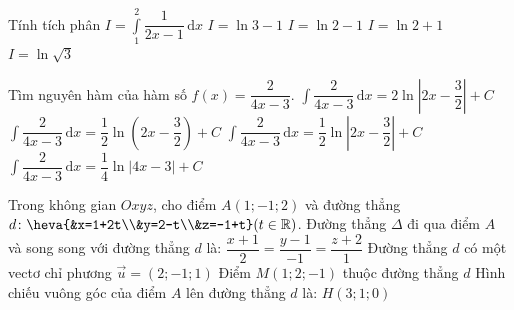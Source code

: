 \begin{ex}%
	Tính tích phân $I=\displaystyle\int \limits_1^2\dfrac{1}{2x-1}\mathrm{\,d}x$
	\choice
	{$I=\ln 3-1$}
	{$I=\ln 2-1$}
	{$I=\ln 2+1$}
	{\True $I=\ln \sqrt{3}$}
\end{ex}

\begin{ex}%
	Tìm nguyên hàm của hàm số $f(x)=\dfrac{2}{4x-3}$.
	\choice
	{$\displaystyle\int \dfrac{2}{4x-3}\mathrm{\,d}x=2\ln \left|2x-\dfrac{3}{2}\right|+C$}
	{$\displaystyle\int \dfrac{2}{4x-3}\mathrm{\,d}x=\dfrac{1}{2}\ln \left(2x-\dfrac{3}{2}\right)+C$}
	{\True $\displaystyle\int \dfrac{2}{4x-3}\mathrm{\,d}x=\dfrac{1}{2}\ln \left|2x-\dfrac{3}{2}\right|+C$}
	{$\displaystyle\int \dfrac{2}{4x-3}\mathrm{\,d}x=\dfrac{1}{4}\ln |4x-3|+C$}
\end{ex}

\cauds
\begin{ex}%
	Trong không gian $Oxyz$, cho điểm $A(1;-1;2)$ và đường thẳng $d\colon \heva{&x=1+2t\\&y=2-t\\&z=-1+t}(t\in \mathbb{R})$.
	\choiceTF
	{\True Đường thẳng $\Delta$ đi qua điểm $A$ và song song với đường thẳng $d$ là: $\dfrac{x+1}{2}=\dfrac{y-1}{-1}=\dfrac{z+2}{1}$}
	{\True Đường thẳng $d$ có một vectơ chỉ phương $\vec{u}=(2;-1;1)$}
	{Điểm $M(1;2;-1)$ thuộc đường thẳng $d$}
	{\True Hình chiếu vuông góc của điểm $A$ lên đường thẳng $d$ là: $H(3;1;0)$}
\end{ex}

